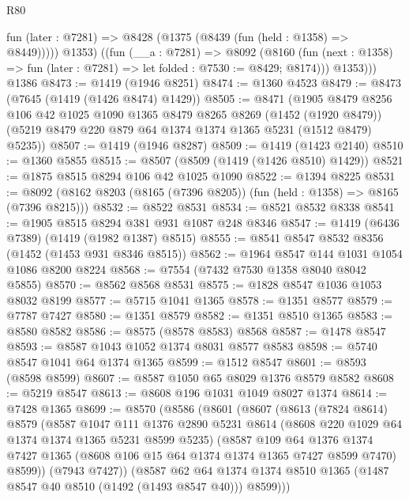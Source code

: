 \begin{lexlean}{R80}
\begin{coremodule}
          fun (later : @7281) => @8428 (@1375 (@8439 (fun (held : @1358) => @8449)))))
          @1353)
        ((fun (__a : @7281) =>
        @8092
          (@8160 (fun (next : @1358) => fun (later : @7281) => let folded : @7530 := @8429; @8174)))
          @1353)))
    @1386
@8473 := @1419 (@1946 @8251)
@8474 := @1360 @4523
@8479 := @8473 (@7645 (@1419 (@1426 @8474) @1429))
@8505 := @8471
    (@1905
      @8479
      @8256
      @106
      @42
      @1025
      @1090
      @1365
      @8479
      @8265
      @8269
      (@1452 (@1920 @8479))
      (@5219 @8479 @220 @879 @64 @1374 @1374 @1365 @5231 (@1512 @8479) @5235))
@8507 := @1419 (@1946 @8287)
@8509 := @1419 (@1423 @2140)
@8510 := @1360 @5855
@8515 := @8507 (@8509 (@1419 (@1426 @8510) @1429))
@8521 := @1875 @8515 @8294 @106 @42 @1025 @1090
@8522 := @1394 @8225
@8531 := @8092 (@8162 @8203 (@8165 (@7396 @8205)) (fun (held : @1358) => @8165 (@7396 @8215)))
@8532 := @8522 @8531
@8534 := @8521 @8532 @8338
@8541 := @1905 @8515 @8294 @381 @931 @1087 @248 @8346
@8547 := @1419 (@6436 @7389) (@1419 (@1982 @1387) @8515)
@8555 := @8541 @8547 @8532 @8356 (@1452 (@1453 @931 @8346 @8515))
@8562 := @1964 @8547 @144 @1031 @1054 @1086 @8200 @8224
@8568 := @7554 (@7432 @7530 @1358 @8040 @8042 @5855)
@8570 := @8562 @8568 @8531
@8575 := @1828 @8547 @1036 @1053 @8032 @8199
@8577 := @5715 @1041 @1365
@8578 := @1351 @8577
@8579 := @7787 @7427
@8580 := @1351 @8579
@8582 := @1351 @8510 @1365
@8583 := @8580 @8582
@8586 := @8575 (@8578 @8583) @8568
@8587 := @1478 @8547
@8593 := @8587 @1043 @1052 @1374 @8031 @8577 @8583
@8598 := @5740 @8547 @1041 @64 @1374 @1365
@8599 := @1512 @8547
@8601 := @8593 (@8598 @8599)
@8607 := @8587 @1050 @65 @8029 @1376 @8579 @8582
@8608 := @5219 @8547
@8613 := @8608 @196 @1031 @1049 @8027 @1374
@8614 := @7428 @1365
@8699 := @8570
    (@8586
      (@8601
        (@8607
          (@8613
            (@7824 @8614)
            @8579
            (@8587
              @1047
              @111
              @1376
              @2890
              @5231
              @8614
              (@8608 @220 @1029 @64 @1374 @1374 @1365 @5231 @8599 @5235)
              (@8587
                @109
                @64
                @1376
                @1374
                @7427
                @1365
                (@8608 @106 @15 @64 @1374 @1374 @1365 @7427 @8599 @7470)
                @8599))
            (@7943 @7427))
          (@8587
            @62
            @64
            @1374
            @1374
            @8510
            @1365
            (@1487 @8547 @40 @8510 (@1492 (@1493 @8547 @40)))
            @8599)))

\end{coremodule}
\end{lexlean}
